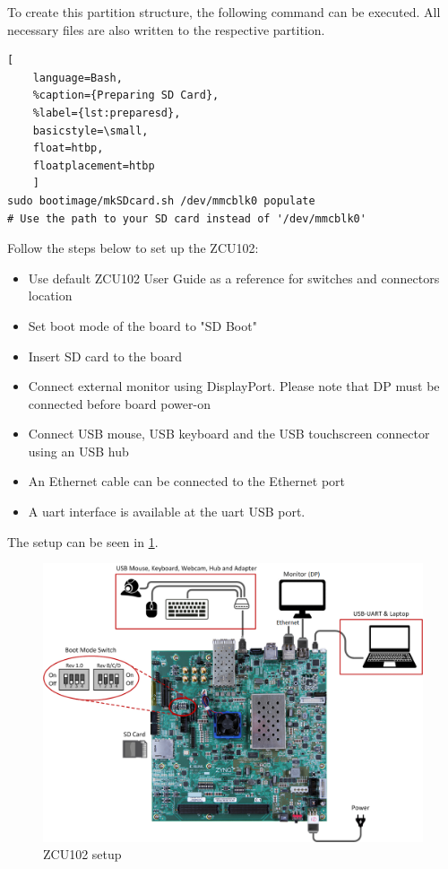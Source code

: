 To create this partition structure, the following command can be executed. All necessary files are also written to the respective partition.
\begin{lstlisting}[
	language=Bash,
	%caption={Preparing SD Card},
	%label={lst:preparesd},
	basicstyle=\small,
	float=htbp,
	floatplacement=htbp
	]
sudo bootimage/mkSDcard.sh /dev/mmcblk0 populate
# Use the path to your SD card instead of '/dev/mmcblk0'
\end{lstlisting}

Follow the steps below to set up the ZCU102:
\begin{itemize}
    \item Use default ZCU102 User Guide \cite{UG1182} as a reference for switches and connectors location
    \item Set boot mode of the board to "SD Boot"
    \item Insert SD card to the board
    \item Connect external monitor using DisplayPort. Please note that DP must be connected before board power-on
    \item Connect USB mouse, USB keyboard and the USB touchscreen connector using an USB hub
    \item An Ethernet cable can be connected to the Ethernet port
    \item A \gls{uart} interface is available at the \gls{uart} USB port.
\end{itemize}

The setup can be seen in \cref{fig:zcu102setup}.

\begin{figure}[htbp]
    \centering
    \includegraphics[width=1\textwidth]{images/ZCU102.png}
    \caption{\label{fig:zcu102setup} ZCU102 setup}
\end{figure}


